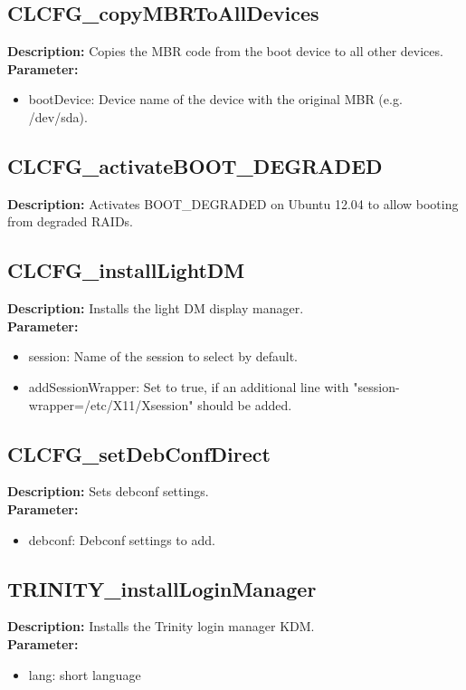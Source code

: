 \subsection{CLCFG\_copyMBRToAllDevices}
\textbf{Description:} Copies the MBR code from the boot device to all other devices.\\
\textbf{Parameter:}
\begin{itemize}
\item bootDevice: Device name of the device with the original MBR (e.g. /dev/sda).
\end{itemize}

\subsection{CLCFG\_activateBOOT\_DEGRADED}
\textbf{Description:} Activates BOOT\_DEGRADED on Ubuntu 12.04 to allow booting from degraded RAIDs.\\

\subsection{CLCFG\_installLightDM}
\textbf{Description:} Installs the light DM display manager.\\
\textbf{Parameter:}
\begin{itemize}
\item session: Name of the session to select by default.
\item addSessionWrapper: Set to true, if an additional line with "session-wrapper=/etc/X11/Xsession" should be added.
\end{itemize}

\subsection{CLCFG\_setDebConfDirect}
\textbf{Description:} Sets debconf settings.\\
\textbf{Parameter:}
\begin{itemize}
\item debconf: Debconf settings to add.
\end{itemize}

\subsection{TRINITY\_installLoginManager}
\textbf{Description:} Installs the Trinity login manager KDM.\\
\textbf{Parameter:}
\begin{itemize}
\item lang: short language
\end{itemize}


